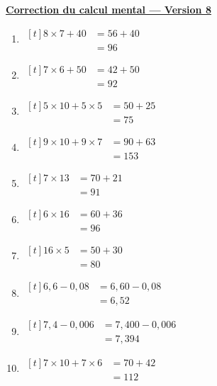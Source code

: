 \documentclass[12pt,a4paper]{article}
\newcommand{\titreversion}[1]{%
  \begin{center}%
    {\Large\underline{\textbf{#1}}}%
  \end{center}%
}
\begin{document}
\titreversion{Correction du calcul mental --- Version 8}
\begin{enumerate}
\item {$\begin{aligned}[t]
8\times 7+40 &= 56+40\\
             &= \boxed{96}
\end{aligned}$}
\item {$\begin{aligned}[t]
7\times 6+50 &= 42+50\\
             &= \boxed{92}
\end{aligned}$}
\item {$\begin{aligned}[t]
5\times 10+5\times 5 &= 50+25\\
                     &= \boxed{75}
\end{aligned}$}
\item {$\begin{aligned}[t]
9\times 10+9\times 7 &= 90+63\\
                     &= \boxed{153}
\end{aligned}$}
\item {$\begin{aligned}[t]
7\times 13 &= 70+21\\
           &= \boxed{91}
\end{aligned}$}
\item {$\begin{aligned}[t]
6\times 16 &= 60+36\\
           &= \boxed{96}
\end{aligned}$}
\item {$\begin{aligned}[t]
16\times 5 &= 50+30\\
           &= \boxed{80}
\end{aligned}$}
\item {$\begin{aligned}[t]
6{,}6-0{,}08 &= 6{,}60-0{,}08\\
             &= \boxed{6{,}52}
\end{aligned}$}
\item {$\begin{aligned}[t]
7{,}4-0{,}006 &= 7{,}400-0{,}006\\
              &= \boxed{7{,}394}
\end{aligned}$}
\item {$\begin{aligned}[t]
7\times 10+7\times 6 &= 70+42\\
                     &= \boxed{112}
\end{aligned}$}
\end{enumerate}
\end{document}
